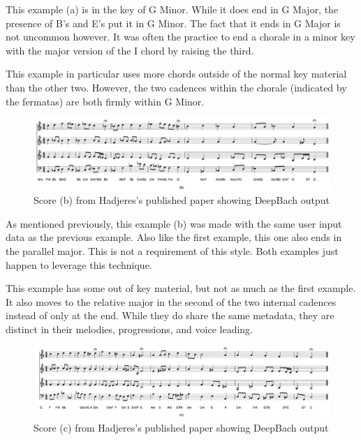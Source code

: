 This example (a) is in the key of G Minor.  While it does end in G Major, the presence of B\fl 's and E\fl 's put it in G Minor.  The fact that it ends in G Major is not uncommon however.  It was often the practice to end a chorale in a minor key with the major version of the I chord by raising the third.

\vspace{\baselineskip}

This example in particular uses more chords outside of the normal key material than the other two.  However, the two cadences within the chorale (indicated by the fermatas) are both firmly within G Minor.

\begin{figure}[!htbp]
	\centering
	\caption{Score (b) from Hadjeres's published paper showing DeepBach output \cite{Hadjeres_2016}}
	\includegraphics[scale=0.3]{images/deepbachOutputB.png}
\end{figure}

As mentioned previously, this example (b) was made with the same user input data as the previous example.  Also like the first example, this one also ends in the parallel major.  This is not a requirement of this style.  Both examples just happen to leverage this technique.

\vspace{\baselineskip}

This example has some out of key material, but not as much as the first example.  It also moves to the relative major in the second of the two internal cadences instead of only at the end.  While they do share the same metadata, they are distinct in their melodies, progressions, and voice leading.

\pagebreak

\begin{figure}[!htbp]
	\centering
	\caption{Score (c) from Hadjeres's published paper showing DeepBach output \cite{Hadjeres_2016}}
	\includegraphics[scale=0.3]{images/deepbachOutputC.png}
\end{figure}

